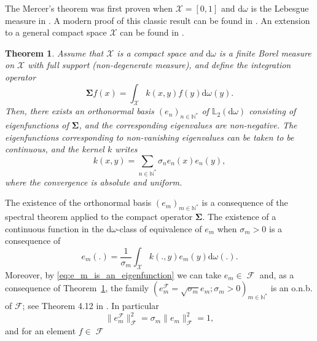 \documentclass[twoside,11pt]{book}
\newtheorem{theorem}{Theorem}
\numberwithin{theorem}{chapter}
\numberwithin{definition}{chapter}
\numberwithin{proposition}{chapter}
\numberwithin{corollary}{chapter}
\numberwithin{example}{chapter}
\numberwithin{lemma}{chapter}
\numberwithin{assumption}{chapter}
\numberwithin{equation}{chapter}
\numberwithin{figure}{chapter}
\DeclareMathOperator{\F}{\mathcal{F}}
\DeclareMathOperator{\X}{\mathcal{X}}
\begin{document}


The Mercer's theorem was first proven when $\mathcal{X} = [0,1]$ and $\mathrm{d}\omega$ is the Lebesgue measure in \cite{Mer1909}.
A modern proof of this classic result can be found in \cite{Lax02}. An extension to a general compact space $\mathcal{X}$ can be  found in \cite{CuZh07}. 


\begin{theorem}\label{thm:Mercer_for_compact}
Assume that $\mathcal{X}$ is a compact space and $\mathrm{d}\omega$ is a finite Borel measure on $\mathcal{X}$ with full support (non-degenerate measure), and define the integration operator
\begin{equation}
\bm{\Sigma} f(x) = \int_{\mathcal{X}} k(x,y)f(y) \mathrm{d}\omega(y).
\end{equation}
Then, there exists an orthonormal basis $(e_{n})_{n \in \mathbb{N}^{*}}$ of $\mathbb{L}_{2}(\mathrm{d}\omega)$ consisting of eigenfunctions of $\bm{\Sigma}$, and the corresponding eigenvalues are non-negative.
The eigenfunctions corresponding to non-vanishing eigenvalues can be taken to be continuous, and the kernel $k$ writes
\begin{equation}
k(x,y) = \sum\limits_{n \in \mathbb{N}^{*}} \sigma_{n} e_{n}(x)e_{n}(y),
\end{equation}
where the convergence is absolute and uniform.
\end{theorem}
The existence of the orthonormal basis $(e_m)_{m \in \mathbb{N}^{*}}$ is a consequence of the spectral theorem applied to the compact operator $\bm{\Sigma}$. The existence of a continuous function in the $\mathrm{d}\omega$-class of equivalence of $e_{m}$ when $\sigma_m>0$ is a consequence of
\begin{equation}\label{eq:e_m_is_an_eigenfunction}
e_{m}(.) = \frac{1}{\sigma_m} \int_{\X}k(.,y) e_{m}(y) \mathrm{d}\omega(.).
\end{equation}
Moreover, by \eqref{eq:e_m_is_an_eigenfunction} we can take $e_{m} \in \F$ and, as a consequence of Theorem~\ref{thm:Mercer_for_compact}, the family $(e_{m}^{\F} = \sqrt{\sigma_m}e_m; \sigma_m>0)_{m \in \mathbb{N}^{*}}$ is an o.n.b. of $\mathcal{F}$; see Theorem 4.12 in \cite{CuZh07}. In particular
\begin{equation}
\|e_{m}^{\F}\|_{\F}^{2} = \sigma_{m}\|e_{m}\|_{\F}^{2} = 1,
\end{equation}
and for an element $f \in \F$ 
\end{document}
